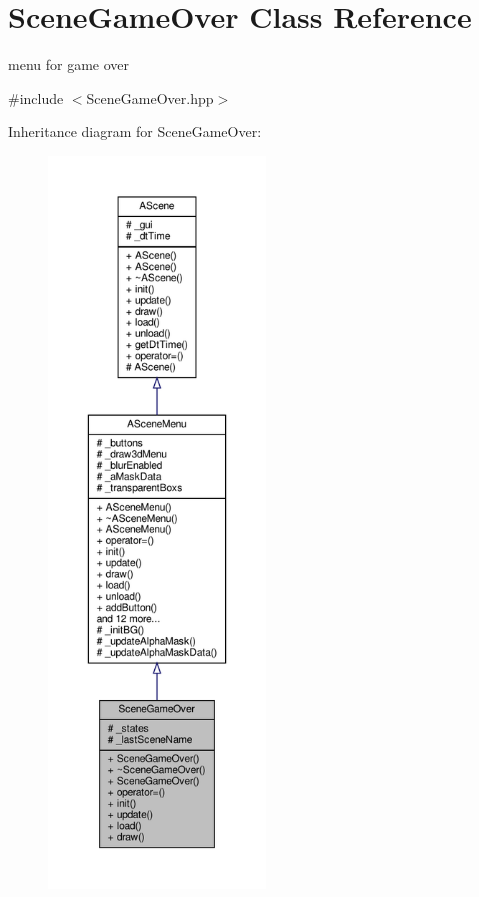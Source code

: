 \hypertarget{class_scene_game_over}{}\section{Scene\+Game\+Over Class Reference}
\label{class_scene_game_over}


menu for game over  




{\ttfamily \#include $<$Scene\+Game\+Over.\+hpp$>$}



Inheritance diagram for Scene\+Game\+Over\+:
\nopagebreak
\begin{figure}[H]
\begin{center}
\leavevmode
\includegraphics[height=550pt]{class_scene_game_over__inherit__graph}
\end{center}
\end{figure}


